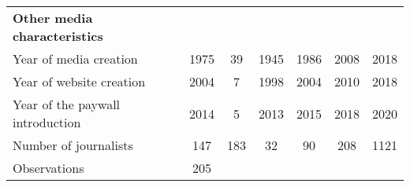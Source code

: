 {\begin{tabular}{l*{1}{cccccc}}
\textbf{Other media characteristics}&            &            &            &            &            &            \\
Year of media creation&        1975&          39&        1945&        1986&        2008&        2018\\
Year of website creation&        2004&           7&        1998&        2004&        2010&        2018\\
Year of the paywall introduction&        2014&           5&        2013&        2015&        2018&        2020\\
Number of journalists&         147&         183&          32&          90&         208&        1121\\
\hline
Observations        &         205&            &            &            &            &            \\
\hline\hline
\end{tabular}
}
